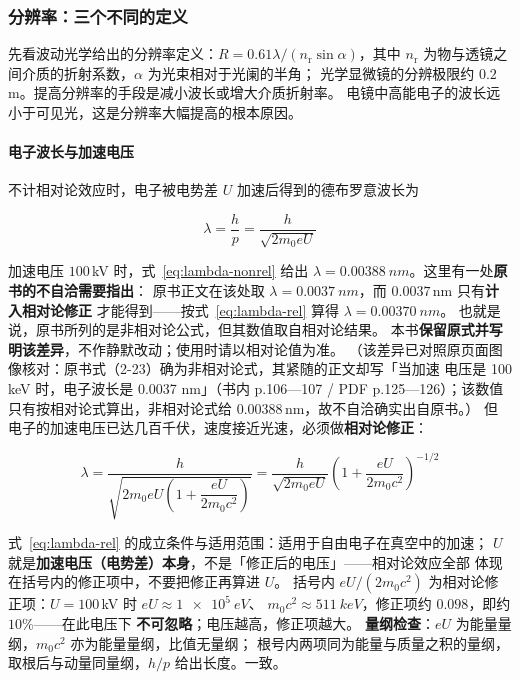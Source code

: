 \subsubsection{分辨率：三个不同的定义}

先看波动光学给出的分辨率定义：$R=0.61\lambda/(n_{\mathrm{r}}\sin\alpha)$，其中
$n_{\mathrm{r}}$ 为物与透镜之间介质的折射系数，$\alpha$ 为光束相对于光阑的半角；
光学显微镜的分辨极限约 $0.2$\,\textmu m。提高分辨率的手段是减小波长或增大介质折射率。
电镜中高能电子的波长远小于可见光，这是分辨率大幅提高的根本原因。

\paragraph{电子波长与加速电压}
不计相对论效应时，电子被电势差 $U$ 加速后得到的德布罗意波长为

\begin{equation}\label{eq:lambda-nonrel}
\lambda=\frac{h}{p}=\frac{h}{\sqrt{2m_{0}eU}}
\end{equation}

加速电压 $100$\,kV 时，式~\eqref{eq:lambda-nonrel} 给出
$\lambda=\qty{0.00388}{nm}$。这里有一处\textbf{原书的不自洽需要指出}：
原书正文在该处取 $\lambda=\qty{0.0037}{nm}$，而 $0.0037$\,nm 只有\textbf{计入相对论修正}
才能得到——按式~\eqref{eq:lambda-rel} 算得 $\lambda=\qty{0.00370}{nm}$。
也就是说，原书所列的是非相对论公式，但其数值取自相对论结果。
本书\textbf{保留原式并写明该差异}，不作静默改动；使用时请以相对论值为准。
（该差异已对照原页面图像核对：原书式（2-23）确为非相对论式，其紧随的正文却写「当加速
电压是 100 keV 时，电子波长是 0.0037 nm」（书内 p.106—107 / PDF p.125—126）；该数值
只有按相对论式算出，非相对论式给 $0.00388$\,nm，故不自洽确实出自原书。）
但电子的加速电压已达几百千伏，速度接近光速，必须做\textbf{相对论修正}：

\begin{equation}\label{eq:lambda-rel}
\lambda=\frac{h}{\sqrt{2m_{0}eU\left(1+\dfrac{eU}{2m_{0}c^{2}}\right)}}
=\frac{h}{\sqrt{2m_{0}eU}}\left(1+\frac{eU}{2m_{0}c^{2}}\right)^{-1/2}
\end{equation}

\begin{keycond}
式~\eqref{eq:lambda-rel} 的成立条件与适用范围：适用于自由电子在真空中的加速；
$U$ 就是\textbf{加速电压（电势差）本身}，不是「修正后的电压」——相对论效应全部
体现在括号内的修正项中，不要把修正再算进 $U$。
括号内 $eU/(2m_{0}c^{2})$ 为相对论修正项：$U=100$\,kV 时 $eU\approx\qty{1e5}{eV}$、
$m_{0}c^{2}\approx\qty{511}{keV}$，修正项约 $0.098$，即约 $10\%$——在此电压下
\textbf{不可忽略}；电压越高，修正项越大。
\textbf{量纲检查}：$eU$ 为能量量纲，$m_{0}c^{2}$ 亦为能量量纲，比值无量纲；
根号内两项同为能量与质量之积的量纲，取根后与动量同量纲，$h/p$ 给出长度。一致。
\end{keycond}

